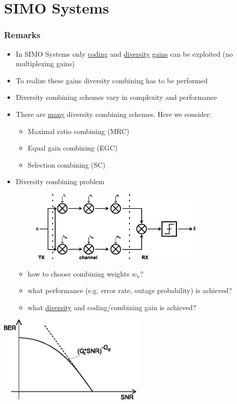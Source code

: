 \documentclass[a4paper, 10pt]{article}
\begin{document}
\section{SIMO Systems}
\subsubsection*{Remarks}
\begin{itemize}
	\item In SIMO Systems only \underline{coding} and \underline{diversity} \underline{gains} can be exploited (no multiplexing gains)
	\item To realize these gains diversity combining has to be performed
	\item Diversity combining schemes vary in complexity and performance
	\item There are \underline{many} diversity combining schemes. Here we consider:
	\begin{itemize}
		\item Maximal ratio combining (MRC)
		\item Equal gain combining (EGC)
		\item Selection combining (SC)
	\end{itemize}
	\item Diversity combining problem
	\begin{figure}[h]\centering
		\includegraphics[width=0.8\textwidth]{Multi_Channel}
	\end{figure}		
	
	\begin{itemize}
		\item how to choose combining weights $w_n$?
		\item what performance (e.g. error rate, outage probability) is achieved?
		\item what \underline{diversity} and coding/combining gain is achieved?
	\end{itemize}
\end{itemize}
\begin{minipage}[hbt]{7cm}
	\centering
	\includegraphics[width=7cm]{SIMO_BER_SNR_Kurve}
\end{minipage}
\end{document}
